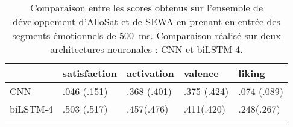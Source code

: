 \begin{table}[htp!]
    \centering
    \begin{tabular}{|l|l||l|l|l|}
        \hline
                    &satisfaction &activation &valence &liking \\
        \hline
        CNN         &.046 (.151)   &.368 (.401) &.375 (.424) &.074 (.089)\\
        biLSTM-4    &.503 (.517)   &.457(.476) &.411(.420) &.248(.267) \\
         &\\
        \hline
    \end{tabular}
    \caption{Comparaison entre les scores obtenus sur l'ensemble de développement d'AlloSat et de SEWA en prenant en entrée des segments émotionnels de 500~ms. Comparaison réalisé sur deux architectures neuronales : CNN et biLSTM-4.}
    \label{tab:pasAnnotation}
\end{table}
